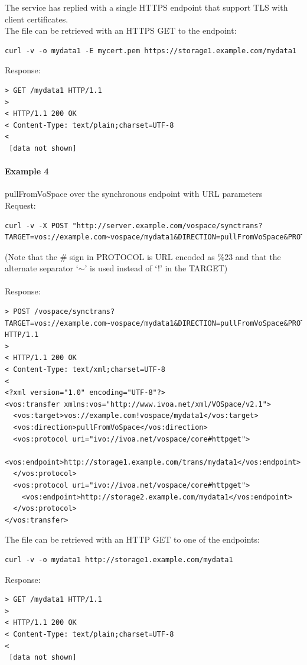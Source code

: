 \documentclass[11pt,a4paper]{ivoa}
\begin{document}
The service has replied with a single HTTPS endpoint that support TLS with client certificates.\\
The file can be retrieved with an HTTPS GET to the endpoint:
\begin{lstlisting}
curl -v -o mydata1 -E mycert.pem https://storage1.example.com/mydata1
\end{lstlisting}
Response:
\begin{lstlisting}
> GET /mydata1 HTTP/1.1
>
< HTTP/1.1 200 OK
< Content-Type: text/plain;charset=UTF-8
<
 [data not shown]
\end{lstlisting}

\paragraph{Example 4}
pullFromVoSpace over the synchronous endpoint with URL parameters
\\[5px]
\noindent
Request:
\begin{lstlisting}
curl -v -X POST "http://server.example.com/vospace/synctrans?TARGET=vos://example.com~vospace/mydata1&DIRECTION=pullFromVoSpace&PROTOCOL=ivo://ivoa.net/vospace/core%23httpget"
\end{lstlisting}
(Note that the \# sign in PROTOCOL is URL encoded as \%23 and that the alternate separator `$\mathtt{\sim}$' is used instead of `!' in the TARGET) \\
\\
Response:
\begin{lstlisting}
> POST /vospace/synctrans?TARGET=vos://example.com~vospace/mydata1&DIRECTION=pullFromVoSpace&PROTOCOL=ivo://ivoa.net/vospace/core\%23httpget HTTP/1.1
>
< HTTP/1.1 200 OK
< Content-Type: text/xml;charset=UTF-8
<
<?xml version="1.0" encoding="UTF-8"?>
<vos:transfer xmlns:vos="http://www.ivoa.net/xml/VOSpace/v2.1">
  <vos:target>vos://example.com!vospace/mydata1</vos:target>
  <vos:direction>pullFromVoSpace</vos:direction>
  <vos:protocol uri="ivo://ivoa.net/vospace/core#httpget">
    <vos:endpoint>http://storage1.example.com/trans/mydata1</vos:endpoint>
  </vos:protocol>
  <vos:protocol uri="ivo://ivoa.net/vospace/core#httpget">
    <vos:endpoint>http://storage2.example.com/mydata1</vos:endpoint>
  </vos:protocol>
</vos:transfer>
\end{lstlisting}
The file can be retrieved with an HTTP GET to one of the endpoints:
\begin{lstlisting}
curl -v -o mydata1 http://storage1.example.com/mydata1
\end{lstlisting}
Response:
\begin{lstlisting}
> GET /mydata1 HTTP/1.1
>
< HTTP/1.1 200 OK
< Content-Type: text/plain;charset=UTF-8
<
 [data not shown]
 \end{lstlisting}
\end{document}

